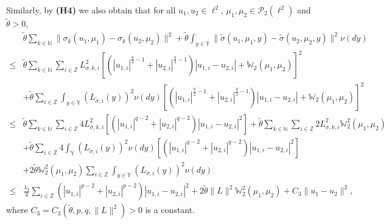 \documentclass[11pt]{article}
\numberwithin{equation}{section}
\theoremstyle{plain}
\begin{document}
 Similarly, 
 by {\bf(H4)} we  also  obtain that for all $u_1, u_2 \in \ell^2 $, $\mu_1, \mu_2  \in \mathcal{P}_2(\ell^2) $ and $\tilde{\theta} > 0$,
 \begin{align} \label{sigma4}
      & \tilde{\theta}\sum_{k \in \mathbb{N}}
               \|\sigma_k(u_1,\mu_1) - \sigma_k(u_2,\mu_2)\|^2
        +
   \tilde{\theta}    
                  \int_{y\in \mathbb{Y}
                  }
                          \|\widetilde{\sigma}(u_1,\mu_1,y) - \widetilde{\sigma}(u_2, \mu_2, y)\|^2\nu (dy)  \nonumber \\
 \le & \tilde{\theta} \sum_{k \in \mathbb{N} } \sum_{i \in \mathbb{Z}}
         L^2_{\sigma, k,i}
              \left[
                     \left( | u_{1,i} |^{\frac{q}{2} - 1}  + | u_{2,i} |^{\frac{q}{2} - 1} \right)
                     | u_{1,i} - u_{2,i} |
                     + \mathbb{W}_2(\mu_1, \mu_2)
              \right]^2  \nonumber\\
      & + \tilde{\theta}   \sum_{i \in \mathbb{Z}}
             \int_{y \in \mathbb{Y}}
                 \left( L_{\widetilde{\sigma}, i} (y) \right )^2 \nu(dy)
                       \left[
                                \left( | u_{1,i} |^{\frac{q}{2} - 1}  + | u_{2,i} |^{\frac{q}{2} - 1} \right)
                                | u_{1,i} - u_{2,i} |
                                + \mathbb{W}_2(\mu_1, \mu_2)
                       \right]^2  \nonumber\\
 \le & \tilde{\theta} \sum_{k \in \mathbb{N} } \sum_{i \in \mathbb{Z}}
         4 L^2_{\sigma, k,i}
                \left[
                       \left( | u_{1,i} |^{q-2} + | u_{2,i} |^{q-2} \right)
                       | u_{1,i} - u_{2,i} |^2
                \right]
           + \tilde{\theta} 
                  \sum_{k \in \mathbb{N} } 
                        \sum_{i \in \mathbb{Z}}  2 L^2_{\sigma, k,i} \mathbb{W}_2^2(\mu_1, \mu_2)  \nonumber\\
      & + \tilde{\theta}   \sum_{i \in \mathbb{Z}}
             4 \int_{\mathbb{Y}}
                    \left( L _{\widetilde{\sigma}, i}(y) \right )^2 \nu(dy)
                         \left[
                                  \left( | u_{1,i} |^{q-2} + | u_{2,i} |^{q-2} \right)
                                  | u_{1,i} - u_{2,i} |^2
                         \right]  \nonumber\\
      & + 2 \tilde{\theta}    
                   \mathbb{W}_2^2(\mu_1, \mu_2) 
                          \sum_{i \in \mathbb{Z}}   
                              \int_{y \in \mathbb{Y}}
                                  \left ( L_{\widetilde{\sigma}, i} (y) \right )^2 \nu(dy)  \nonumber\\
 \le & \frac{\lambda_2}{4}
              \sum_{ i \in \mathbb{Z}} 
                    \left( |u_{1,i}|^{p-2} + |u_{2,i}|^{p-2} \right) |u_{1,i} - u_{2,i}|^2
         + 2 \tilde{\theta} \| L \|^2 
                    \mathbb{W}_2^2(\mu_1, \mu_2)
         + C_3 \|u_1 - u_2 \|^2,
 \end{align}
 where
   $C_3 = C_3(\tilde{\theta}, p, q, \|L\|^2) > 0$
 is a constant.
 
\end{document}
